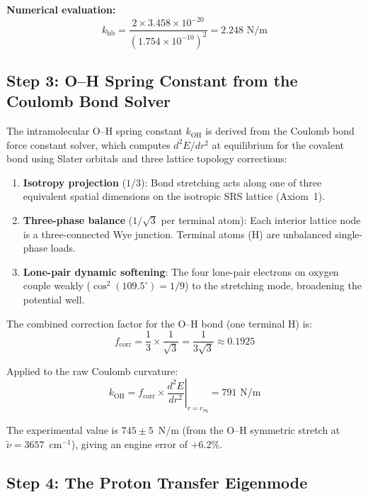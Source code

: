 \noindent\textbf{Numerical evaluation:}
\begin{equation}
  k_\text{hb} = \frac{2 \times 3.458 \times 10^{-20}}{(1.754 \times 10^{-10})^2} 
  = 2.248 \text{ N/m}
\end{equation}

\subsection{Step 3: O--H Spring Constant from the Coulomb Bond Solver}

The intramolecular O--H spring constant $k_\text{OH}$ is derived from the 
Coulomb bond force constant solver, which computes $d^2E/dr^2$ at equilibrium 
for the covalent bond using Slater orbitals and three lattice topology corrections:

\begin{enumerate}
  \item \textbf{Isotropy projection} ($1/3$): Bond stretching acts along 
        one of three equivalent spatial dimensions on the isotropic SRS lattice 
        (Axiom~1).
  \item \textbf{Three-phase balance} ($1/\sqrt{3}$ per terminal atom): 
        Each interior lattice node is a three-connected Wye junction. 
        Terminal atoms (H) are unbalanced single-phase loads.
  \item \textbf{Lone-pair dynamic softening}: The four lone-pair electrons on oxygen 
        couple weakly ($\cos^2(109.5^{\circ}) = 1/9$) to the stretching mode, 
        broadening the potential well.
\end{enumerate}

The combined correction factor for the O--H bond (one terminal H) is:
\begin{equation}
  f_\text{corr} = \frac{1}{3} \times \frac{1}{\sqrt{3}} 
  = \frac{1}{3\sqrt{3}} \approx 0.1925
\end{equation}

Applied to the raw Coulomb curvature:
\begin{equation}
  k_\text{OH} = f_\text{corr} \times 
  \left.\frac{d^2 E}{d r^2}\right|_{r = r_\text{eq}} 
  = 791 \text{ N/m}
  \label{eq:k_OH}
\end{equation}

The experimental value is $745 \pm 5$~N/m (from the O--H symmetric stretch at 
$\tilde{\nu} = 3657$~cm$^{-1}$), giving an engine error of $+6.2\%$.

\subsection{Step 4: The Proton Transfer Eigenmode}

